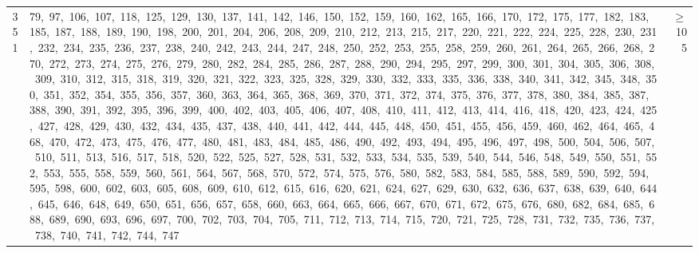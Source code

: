 \begin{longtable}{c|p{}|r}
351 & 79,\ 97,\ 106,\ 107,\ 118,\ 125,\ 129,\ 130,\ 137,\ 141,\ 142,\ 146,\ 150,\ 152,\ 159,\ 160,\ 162,\ 165,\ 166,\ 170,\ 172,\ 175,\ 177,\ 182,\ 183,\ 185,\ 187,\ 188,\ 189,\ 190,\ 198,\ 200,\ 201,\ 204,\ 206,\ 208,\ 209,\ 210,\ 212,\ 213,\ 215,\ 217,\ 220,\ 221,\ 222,\ 224,\ 225,\ 228,\ 230,\ 231,\ 232,\ 234,\ 235,\ 236,\ 237,\ 238,\ 240,\ 242,\ 243,\ 244,\ 247,\ 248,\ 250,\ 252,\ 253,\ 255,\ 258,\ 259,\ 260,\ 261,\ 264,\ 265,\ 266,\ 268,\ 270,\ 272,\ 273,\ 274,\ 275,\ 276,\ 279,\ 280,\ 282,\ 284,\ 285,\ 286,\ 287,\ 288,\ 290,\ 294,\ 295,\ 297,\ 299,\ 300,\ 301,\ 304,\ 305,\ 306,\ 308,\ 309,\ 310,\ 312,\ 315,\ 318,\ 319,\ 320,\ 321,\ 322,\ 323,\ 325,\ 328,\ 329,\ 330,\ 332,\ 333,\ 335,\ 336,\ 338,\ 340,\ 341,\ 342,\ 345,\ 348,\ 350,\ 351,\ 352,\ 354,\ 355,\ 356,\ 357,\ 360,\ 363,\ 364,\ 365,\ 368,\ 369,\ 370,\ 371,\ 372,\ 374,\ 375,\ 376,\ 377,\ 378,\ 380,\ 384,\ 385,\ 387,\ 388,\ 390,\ 391,\ 392,\ 395,\ 396,\ 399,\ 400,\ 402,\ 403,\ 405,\ 406,\ 407,\ 408,\ 410,\ 411,\ 412,\ 413,\ 414,\ 416,\ 418,\ 420,\ 423,\ 424,\ 425,\ 427,\ 428,\ 429,\ 430,\ 432,\ 434,\ 435,\ 437,\ 438,\ 440,\ 441,\ 442,\ 444,\ 445,\ 448,\ 450,\ 451,\ 455,\ 456,\ 459,\ 460,\ 462,\ 464,\ 465,\ 468,\ 470,\ 472,\ 473,\ 475,\ 476,\ 477,\ 480,\ 481,\ 483,\ 484,\ 485,\ 486,\ 490,\ 492,\ 493,\ 494,\ 495,\ 496,\ 497,\ 498,\ 500,\ 504,\ 506,\ 507,\ 510,\ 511,\ 513,\ 516,\ 517,\ 518,\ 520,\ 522,\ 525,\ 527,\ 528,\ 531,\ 532,\ 533,\ 534,\ 535,\ 539,\ 540,\ 544,\ 546,\ 548,\ 549,\ 550,\ 551,\ 552,\ 553,\ 555,\ 558,\ 559,\ 560,\ 561,\ 564,\ 567,\ 568,\ 570,\ 572,\ 574,\ 575,\ 576,\ 580,\ 582,\ 583,\ 584,\ 585,\ 588,\ 589,\ 590,\ 592,\ 594,\ 595,\ 598,\ 600,\ 602,\ 603,\ 605,\ 608,\ 609,\ 610,\ 612,\ 615,\ 616,\ 620,\ 621,\ 624,\ 627,\ 629,\ 630,\ 632,\ 636,\ 637,\ 638,\ 639,\ 640,\ 644,\ 645,\ 646,\ 648,\ 649,\ 650,\ 651,\ 656,\ 657,\ 658,\ 660,\ 663,\ 664,\ 665,\ 666,\ 667,\ 670,\ 671,\ 672,\ 675,\ 676,\ 680,\ 682,\ 684,\ 685,\ 688,\ 689,\ 690,\ 693,\ 696,\ 697,\ 700,\ 702,\ 703,\ 704,\ 705,\ 711,\ 712,\ 713,\ 714,\ 715,\ 720,\ 721,\ 725,\ 728,\ 731,\ 732,\ 735,\ 736,\ 737,\ 738,\ 740,\ 741,\ 742,\ 744,\ 747 & $\ge$ 105 \\

\end{longtable}
